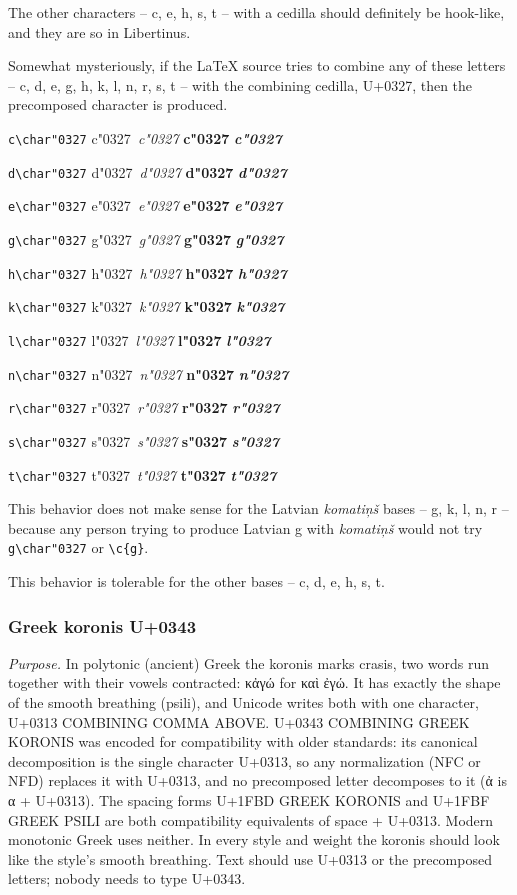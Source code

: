 \documentclass[landscape]{article}
\newcommand{\ribbiline}[1]{#1\ 
	{\itshape #1}
	{\bfseries #1}
	{\itshape\bfseries #1}}
\begin{document}
The other characters -- c, e, h, s, t -- with a cedilla should definitely be hook-like, and they are so in Libertinus.

Somewhat mysteriously, if the LaTeX source tries to combine any of these letters -- c, d, e, g, h, k, l, n, r, s, t -- 
with the combining cedilla, U+0327, then the precomposed character is produced. 

\verb|c\char"0327| \ribbiline{c\char"0327}

\verb|d\char"0327| \ribbiline{d\char"0327}

\verb|e\char"0327| \ribbiline{e\char"0327}

\verb|g\char"0327| \ribbiline{g\char"0327}

\verb|h\char"0327| \ribbiline{h\char"0327}

\verb|k\char"0327| \ribbiline{k\char"0327}

\verb|l\char"0327| \ribbiline{l\char"0327}

\verb|n\char"0327| \ribbiline{n\char"0327}

\verb|r\char"0327| \ribbiline{r\char"0327}

\verb|s\char"0327| \ribbiline{s\char"0327}

\verb|t\char"0327| \ribbiline{t\char"0327}

This behavior does not make sense for the Latvian \textit{komatiņš} bases -- g, k, l, n, r  -- 
because any person trying to produce Latvian g with \textit{komatiņš} would not try \verb|g\char"0327| or \verb|\c{g}|.

This behavior is tolerable for the other bases --  c, d, e, h, s, t.

\subsubsection*{Greek koronis U+0343}

\textit{Purpose.}
In polytonic (ancient) Greek the koronis marks crasis, two words run together with their vowels contracted: κἀγώ for καὶ ἐγώ.
It has exactly the shape of the smooth breathing (psili), and Unicode writes both with one character, U+0313 COMBINING COMMA ABOVE.
U+0343 COMBINING GREEK KORONIS was encoded for compatibility with older standards: its canonical decomposition is the single character U+0313,
so any normalization (NFC or NFD) replaces it with U+0313, and no precomposed letter decomposes to it (ἀ is α + U+0313).
The spacing forms U+1FBD GREEK KORONIS and U+1FBF GREEK PSILI are both compatibility equivalents of space + U+0313.
Modern monotonic Greek uses neither. In every style and weight the koronis should look like the style's smooth breathing.
Text should use U+0313 or the precomposed letters; nobody needs to type U+0343.
\end{document}
